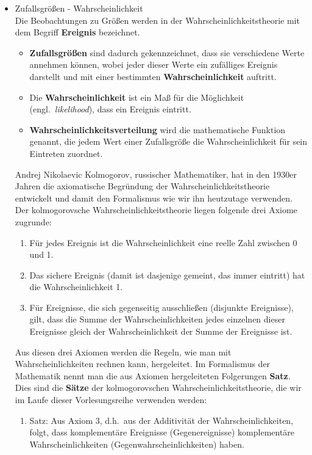 \documentclass[a4paper,12pt,DIV=15]{scrartcl}
\begin{document}
\begin{enumerate}
\begin{itemize}
\item Zufallsgrößen - Wahrscheinlichkeit\\
Die Beobachtungen zu Größen werden in der Wahrscheinlichkeitstheorie mit dem Begriff
\textbf{Ereignis} bezeichnet.
	\begin{itemize}
	\item \textbf{Zufallsgrößen} sind dadurch gekennzeichnet, dass sie verschiedene Werte
	annehmen können, wobei jeder dieser Werte ein zufälliges Ereignis darstellt und mit einer
	bestimmten \textbf{Wahrscheinlichkeit} auftritt.
	\item Die \textbf{Wahrscheinlichkeit} ist ein Maß für die Möglichkeit (engl.\ \textsl{likelihood}),
	dass ein Ereignis eintritt.
	\item \textbf{Wahrscheinlichkeitsverteilung} wird die mathematische Funktion genannt, die jedem Wert
	einer Zufallsgröße die Wahrscheinlichkeit für sein Eintreten zuordnet.
	\end{itemize}
	Andrej Nikolaevic Kolmogorov, russischer Mathematiker, hat in den 1930er Jahren die axiomatische
	Begründung der Wahrscheinlichkeitstheorie entwickelt und damit den Formalismus wie wir ihn heutzutage
	verwenden.
	Der kolmogorovsche Wahrscheinlichkeitstheorie liegen folgende drei Axiome zugrunde:
	\begin{enumerate}
	\item Für jedes Ereignis ist die Wahrscheinlichkeit eine reelle Zahl zwischen 0 und 1.
	\item Das sichere Ereignis (damit ist dasjenige gemeint, das immer eintritt) hat die
		Wahrscheinlichkeit 1.
	\item Für Ereignisse, die sich gegenseitig ausschließen (disjunkte Ereignisse), gilt, dass die Summe der Wahrscheinlichkeiten
		jedes einzelnen dieser Ereignisse gleich der Wahrscheinlichkeit der Summe der Ereignisse ist.
	\end{enumerate}
	Aus diesen drei Axiomen werden die Regeln, wie man mit Wahrscheinlichkeiten rechnen kann, hergeleitet.
	Im Formalismus der Mathematik nennt man die aus Axiomen hergeleiteten Folgerungen \textbf{Satz}. Dies
	sind die \textbf{Sätze} der kolmogorovschen Wahrscheinlichkeitstheorie, die wir im Laufe dieser
	Vorlesungsreihe verwenden werden:
	\begin{enumerate}
	\item Satz: Aus Axiom 3, d.h.\ aus der Additivität der Wahrscheinlichkeiten, folgt, dass komplementäre
		Ereignisse (Gegenereignisse) komplementäre Wahrscheinlichkeiten (Gegenwahrscheinlichkeiten) haben.


\end{enumerate}
\end{itemize}
\end{enumerate}
\end{document}

